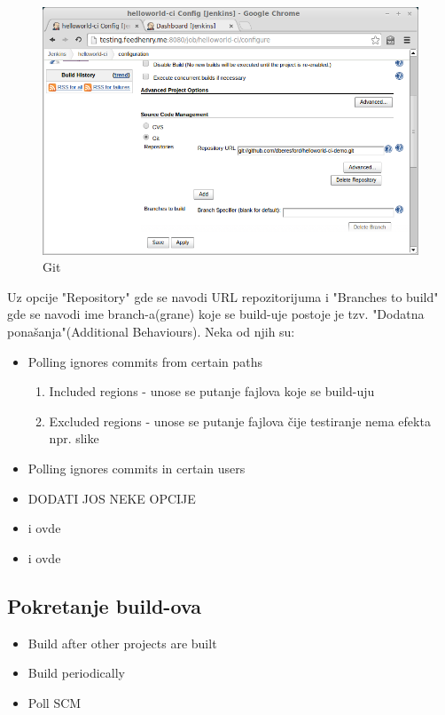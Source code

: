\begin{figure}[h!]
\begin{center}
\includegraphics[scale=0.75, totalheight=0.4\textheight]{git_jenkins.jpg}
\end{center}
\caption{Git}
\label{fig:git}
\end{figure}

Uz opcije "Repository" gde se navodi URL repozitorijuma i "Branches to build" gde se navodi ime branch-a(grane) koje se build-uje postoje je tzv. "Dodatna ponašanja"(Additional Behaviours). Neka od njih su:
 
\begin{itemize}  
\item Polling ignores commits from certain paths
\begin{enumerate}
\item Included regions - unose se putanje fajlova koje se build-uju
\item Excluded regions - unose se putanje fajlova čije testiranje nema efekta npr. slike
\end{enumerate}
\item Polling ignores commits in certain users 
\item DODATI JOS NEKE OPCIJE
\item i ovde
\item i ovde
\end{itemize}

\subsection{Pokretanje build-ova}

\begin{itemize}  
\item Build after other projects are built
\item Build periodically
\item Poll SCM
\end{itemize}

